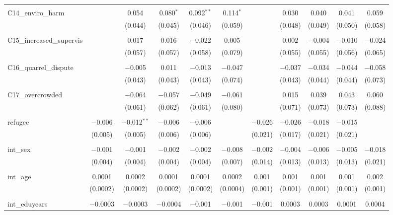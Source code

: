 \begin{table}[H]
\begin{tabular}{@{\extracolsep{4pt}}lcccccccccc}
  & & & & & & & & & & \\ 
 C14\_enviro\_harm &  & 0.054 & 0.080$^{*}$ & 0.092$^{**}$ & 0.114$^{*}$ &  & 0.030 & 0.040 & 0.041 & 0.059 \\ 
  &  & (0.044) & (0.045) & (0.046) & (0.059) &  & (0.048) & (0.049) & (0.050) & (0.058) \\ 
  & & & & & & & & & & \\ 
 C15\_increased\_supervis &  & 0.017 & 0.016 & $-$0.022 & 0.005 &  & 0.002 & $-$0.004 & $-$0.010 & $-$0.024 \\ 
  &  & (0.057) & (0.057) & (0.058) & (0.079) &  & (0.055) & (0.055) & (0.056) & (0.065) \\ 
  & & & & & & & & & & \\ 
 C16\_quarrel\_dispute &  & $-$0.005 & 0.011 & $-$0.013 & $-$0.047 &  & $-$0.037 & $-$0.034 & $-$0.044 & $-$0.058 \\ 
  &  & (0.043) & (0.043) & (0.043) & (0.074) &  & (0.043) & (0.044) & (0.044) & (0.073) \\ 
  & & & & & & & & & & \\ 
 C17\_overcrowded &  & $-$0.064 & $-$0.057 & $-$0.049 & $-$0.061 &  & 0.015 & 0.039 & 0.043 & 0.060 \\ 
  &  & (0.061) & (0.062) & (0.061) & (0.080) &  & (0.071) & (0.073) & (0.073) & (0.088) \\ 
  & & & & & & & & & & \\ 
 refugee & $-$0.006 & $-$0.012$^{**}$ & $-$0.006 & $-$0.006 &  & $-$0.026 & $-$0.026 & $-$0.018 & $-$0.015 &  \\ 
  & (0.005) & (0.005) & (0.006) & (0.006) &  & (0.021) & (0.017) & (0.021) & (0.021) &  \\ 
  & & & & & & & & & & \\ 
 int\_sex & $-$0.001 & $-$0.001 & $-$0.002 & $-$0.002 & $-$0.008 & $-$0.002 & $-$0.004 & $-$0.006 & $-$0.005 & $-$0.018 \\ 
  & (0.004) & (0.004) & (0.004) & (0.004) & (0.007) & (0.014) & (0.013) & (0.013) & (0.013) & (0.021) \\ 
  & & & & & & & & & & \\ 
 int\_age & 0.0001 & 0.0002 & 0.0001 & 0.0001 & 0.0002 & 0.001 & 0.001 & 0.001 & 0.001 & 0.002 \\ 
  & (0.0002) & (0.0002) & (0.0002) & (0.0002) & (0.0004) & (0.001) & (0.001) & (0.001) & (0.001) & (0.001) \\ 
  & & & & & & & & & & \\ 
 int\_eduyears & $-$0.0003 & $-$0.0003 & $-$0.0004 & $-$0.001 & $-$0.001 & $-$0.001 & 0.0003 & 0.0003 & 0.0001 & 0.0004 \\ 

\end{tabular}
\end{table}
